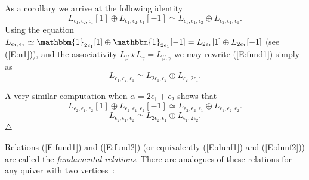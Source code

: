 \documentclass[a4paper,10pt]{amsart}
\def\endexample{$\hfill \triangle$}
\def\endexample{$\hfill \triangle$}
\def\a{\alpha}
\numberwithin{equation}{section}
\begin{document}
As a corollary we arrive at the following identity
\begin{equation}\label{E:fund1}
L_{\epsilon_1, \epsilon_2, \epsilon_1}[1] \oplus L_{\epsilon_1, \epsilon_2, \epsilon_1}[-1] \simeq L_{\epsilon_1, \epsilon_1, \epsilon_2} \oplus L_{\epsilon_2, \epsilon_1, \epsilon_1}.
\end{equation}
Using the equation $L_{\epsilon_1, \epsilon_1} \simeq \mathbbm{1}_{2\epsilon_1}[1] \oplus  \mathbbm{1}_{2\epsilon_1}[-1] = L_{2\epsilon_1}[1] \oplus  L_{2\epsilon_1}[-1]$ (see (\ref{E:n1})), and the associativity $L_{\beta} \star L_{\gamma}=L_{\beta,\gamma}$ we may rewrite (\ref{E:fund1}) simply as
\begin{equation}\label{E:dunf1}
L_{\epsilon_1, \epsilon_2, \epsilon_1} \simeq L_{2\epsilon_1, \epsilon_2} \oplus L_{\epsilon_2, 2\epsilon_1}.
\end{equation}

A very similar computation when $\a=2\epsilon_1 +\epsilon_2$ shows that
\begin{equation}\label{E:fund2}
L_{\epsilon_2, \epsilon_1, \epsilon_2}[1] \oplus L_{\epsilon_2, \epsilon_1, \epsilon_2}[-1] \simeq L_{\epsilon_2, \epsilon_2, \epsilon_1} \oplus L_{\epsilon_1, \epsilon_2, \epsilon_2}.
\end{equation}
\begin{equation}\label{E:dunf2}
L_{\epsilon_2, \epsilon_1, \epsilon_2} \simeq L_{2\epsilon_2, \epsilon_1} \oplus L_{\epsilon_1, 2\epsilon_2}.
\end{equation}
\endexample

\vspace{.1in}

Relations (\ref{E:fund1}) and (\ref{E:fund2}) (or equivalently (\ref{E:dunf1}) and (\ref{E:dunf2})) are called the \textit{fundamental relations}. There are analogues of these relations for any quiver with two vertices~:

\vspace{.1in}
\end{document}
